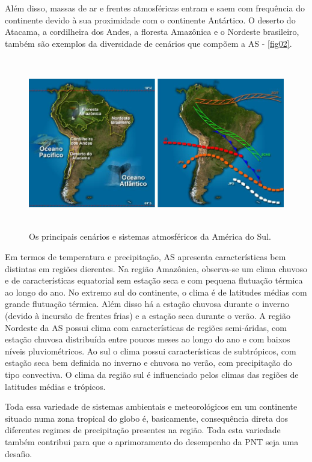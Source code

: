 Além disso, massas de ar e frentes atmosféricas entram e saem com frequência do continente devido à sua proximidade com o continente Antártico. O deserto do Atacama, a cordilheira dos Andes, a floresta Amazônica e o Nordeste brasileiro, também são exemplos da diversidade de cenários que compõem a AS - \autoref{fig02}.

\begin{figure}
\centering
\includegraphics[height=7.5cm]{./figs/fig02.png}
\caption{Os principais cenários e sistemas atmosféricos da América do Sul.}
\label{fig02}
\end{figure}

Em termos de temperatura e precipitação, AS apresenta características bem distintas em regiões dierentes. Na região Amazônica, observa-se um clima chuvoso e de características equatorial sem estação seca e com pequena flutuação térmica ao longo do ano. No extremo sul do continente, o clima é de latitudes médias com grande flutuação térmica. Além disso há a estação chuvosa durante o inverno (\-de\-vi\-do à incursão de frentes frias) e a estação seca durante o verão. A região Nordeste da AS possui clima com características de regiões semi-áridas, com estação chuvosa distribuída entre poucos meses ao longo do ano e com baixos níveis pluviométricos. Ao sul o clima possui características de subtrópicos, com estação seca bem definida no inverno e chuvosa no verão, com precipitação do tipo convectiva. O clima da região sul é influenciado pelos climas das regiões de latitudes médias e trópicos.

Toda essa variedade de sistemas ambientais e meteorológicos em um continente situado numa zona tropical do globo é, basicamente, consequência direta dos diferentes regimes de precipitação presentes na região. Toda esta variedade também contribui para que o aprimoramento do desempenho da PNT seja uma desafio.

